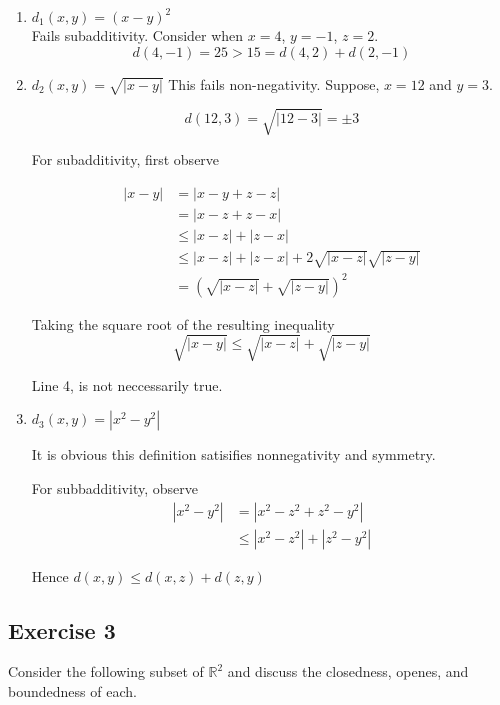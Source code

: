 \documentclass{tufte-book}
\theoremstyle{mytheoremstyle}
\theoremstyle{mylemstyle}
\theoremstyle{mydefstyle}
\begin{document}
\begin{enumerate}
\item $d_1(x,y) = (x-y)^2$ \\
Fails subadditivity.  Consider when
$x=4$, $y=-1$, $z=2$.
\[ d(4,-1) = 25 > 15 = d(4,2) + d(2,-1) \]

\item $d_2(x,y) = \sqrt{|x-y|}$
This fails non-negativity.  Suppose, $x=12$ and $y = 3$.

\[ d(12,3) = \sqrt{|12-3|} = \pm 3 \]

For subadditivity, first observe

\begin{align}
|x - y| &= |x - y + z - z|\\
&= |x - z + z - x| \\
&\leq |x - z| + |z - x|\\
&\leq |x - z| + |z - x| + 2\sqrt{|x-z|}\sqrt{|z-y|}\\
&= (\sqrt{|x-z|} + \sqrt{|z-y|})^2
\end{align}

Taking the square root of the resulting inequality
\[ \sqrt{|x-y|} \leq \sqrt{|x-z|} + \sqrt{|z-y|} \]

Line 4, is not neccessarily true.

\item $d_3(x,y) = |x^2 - y^2|$

It is obvious this definition satisifies nonnegativity and symmetry.

For subbadditivity, observe
\begin{align*}
|x^2 - y^2| &= |x^2 - z^2 + z^2 - y^2| \\
&\leq |x^2 - z^2| + |z^2 - y^2|
\end{align*}

Hence $d(x,y) \leq d(x,z) + d(z,y)$

\end{enumerate}

\subsection{Exercise 3}
Consider the following subset of $\mathbb{R}^2$ and discuss the closedness, openes, and boundedness of each.
\end{document}
